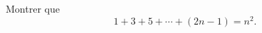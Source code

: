 

\begin{exercice}\label{exoSerieUn0016}

	Montrer que 
	\begin{equation}
		1+3+5+\cdots+(2n-1)=n^2.
	\end{equation}

\end{exercice}
